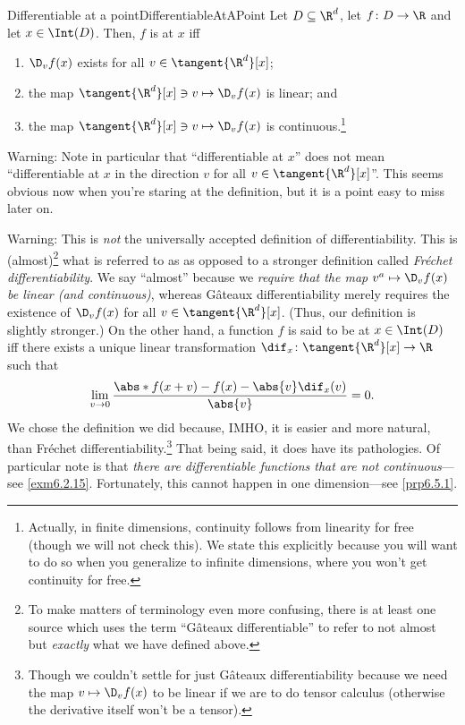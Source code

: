 \begin{dfn}{Differentiable at a point}{DifferentiableAtAPoint}
Let $D\subseteq \R ^d$, let $f\colon D\rightarrow \R$ and let $x\in \Int (D)$.  Then, $f$ is  at $x$ iff
\begin{enumerate}
\item $\D _vf(x)$ exists for all $v\in \tangent{\R ^d}[x]$;
\item the map $\tangent{\R ^d}[x]\ni v\mapsto \D _vf(x)$ is linear; and
\item the map $\tangent{\R ^d}[x]\ni v \mapsto \D _vf(x)$ is continuous.\footnote{Actually, in finite dimensions, continuity follows from linearity for free (though we will not check this).  We state this explicitly because you will want to do so when you generalize to infinite dimensions, where you won't get continuity for free.}
\end{enumerate}
\begin{wrn}
Warning:  Note in particular that ``differentiable at $x$'' does not mean ``differentiable at $x$ in the direction $v$ for all $v\in \tangent{\R ^d}[x]$''.  This seems obvious now when you're staring at the definition, but it is a point easy to miss later on.
\end{wrn}
\begin{wrn}
Warning:  This is \emph{not} the universally accepted definition of differentiability.  This is (almost)\footnote{To make matters of terminology even more confusing, there is at least one source \cite[pg.~117]{Drabek} which uses the term ``Gâteaux differentiable'' to refer to not almost but \emph{exactly} what we have defined above.} what is referred to as  as opposed to a stronger definition called \emph{Fréchet differentiability}.  We say ``almost'' because we \emph{require that the map $v^a\mapsto \D _vf(x)$ be linear (and continuous)}, whereas Gâteaux differentiability merely requires the existence of $\D _vf(x)$ for all $v\in \tangent{\R ^d}[x]$.  (Thus, our definition is slightly stronger.)  On the other hand, a function $f$ is said to be  at $x\in \Int (D)$ iff there exists a unique linear transformation $\dif _x\colon \tangent{\R ^d}[x]\rightarrow \R$ such that
\begin{equation}
\lim _{v\to 0}\frac{\abs*{f(x+v)-f(x)-\abs{v}\dif _x(v)}}{\abs{v}}=0.
\end{equation}
We chose the definition we did because, IMHO, it is easier and more natural, than Fréchet differentiability.\footnote{Though we couldn't settle for just Gâteaux differentiability because we need the map $v\mapsto \D _vf(x)$ to be linear if we are to do tensor calculus (otherwise the derivative itself won't be a tensor).}  That being said, it does have its pathologies.  Of particular note is that \emph{there are differentiable functions that are not continuous}---see \cref{exm6.2.15}.  Fortunately, this cannot happen in one dimension---see \cref{prp6.5.1}.

\end{wrn}
\end{dfn}
